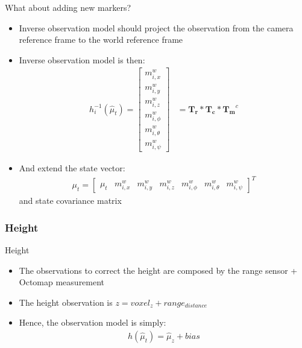 \documentclass[serif]{beamer}
\begin{document}
    \begin{frame}[nonumber]{What about adding new markers?}
        \begin{itemize}
            \item{Inverse observation model should project the observation from the camera reference frame to the world reference frame}
            \item{Inverse observation model is then:
                \begin{align*}
                    h_i^{-1}(\hat\mu_t) =\begin{bmatrix}
                        m_{i, x}^w \\ m_{i, y}^w \\ m_{i, z}^w \\ m_{i, \phi}^w \\ m_{i, \theta}^w \\ m_{i, \psi}^w
                    \end{bmatrix} &= \bm{T_r} * \bm{T_c} * \bm{T_m}^c
                \end{align*}}
            \item{And extend the state vector:
                \begin{align*}
                    \mu_t = \left[\begin{array}{c|cccccc}
                        \mu_t & m_{i, x}^w & m_{i, y}^w & m_{i, z}^w & m_{i, \phi}^w & m_{i, \theta}^w & m_{i, \psi}^w
                    \end{array}
                    \right]^T
                \end{align*}
            and state covariance matrix}
        \end{itemize}
    \end{frame}

    \subsubsection{Height}
    \begin{frame}[nonumber]{Height}
       \begin{itemize}
           \item{The observations to correct the height are composed by the range sensor + Octomap measurement}
           \item{The height observation is $z = voxel_z + range_{distance}$}
           \item{Hence, the observation model is simply: \begin{align*}
                   h\left(\hat\mu_t\right) = \hat\mu_z + bias
           \end{align*}}
       \end{itemize}
    \end{frame}
\end{document}
